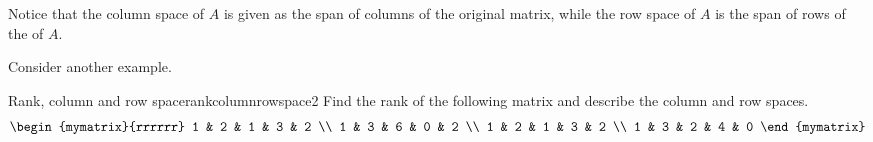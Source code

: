 Notice that the column space of $A$ is given as the span of columns of the original matrix, while the row space of $A$ is the span of rows of the {\rref} of $A$. 

Consider another example.

\begin{example}{Rank, column and row space}{rankcolumnrowspace2}
Find the rank of the following matrix and describe the
column and row spaces.
\begin{equation*}
\begin{mymatrix}{rrrrrr}
1 & 2 & 1 & 3 & 2 \\
1 & 3 & 6 & 0 & 2 \\
1 & 2 & 1 & 3 & 2 \\
1 & 3 & 2 & 4 & 0
\end{mymatrix}
\end{equation*}
\end{example}

